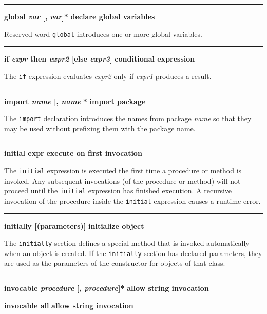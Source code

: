 \bigskip\hrule\vspace{0.1cm}
\noindent
{\bf \textbf{global} \textit{var} [, \textit{var}]* } \hfill {\bf declare global variables}

\noindent
{}Reserved word \texttt{global} introduces one or more
global variables.

\bigskip\hrule\vspace{0.1cm}
\noindent
{\bf \textbf{if} \textit{expr} then \textit{expr2} [else \textit{expr3}] } \hfill {\bf conditional expression}

\noindent
{}The \texttt{if} expression evaluates \textit{expr2} only if
\textit{expr1} produces a result.

\bigskip\hrule\vspace{0.1cm}
\noindent
{\bf \textbf{import} \textit{name} [, \textit{name}]* } \hfill {\bf import package}

\noindent
{}The \texttt{import} declaration introduces the names from
package \textit{name} so that they may be used without prefixing them
with the package name.

\bigskip\hrule\vspace{0.1cm}
\noindent
{\bf initial expr } \hfill {\bf execute on first invocation}

\noindent
{}The \texttt{initial} expression is executed the first
time a procedure or method is invoked.
Any subsequent invocations (of the procedure or method) \ConcurrencyIssue
will not proceed until the \texttt{initial} expression has finished execution.
A recursive invocation of the procedure inside the \texttt{initial} expression
causes a runtime error.

\bigskip\hrule\vspace{0.1cm}
\noindent
{\bf \textbf{initially} [(parameters)] } \hfill {\bf initialize object}

\noindent
{}The \texttt{initially} section defines a special method
that is invoked automatically when an object is created. If the
\texttt{initially} section has declared parameters, they are used as
the parameters of the constructor for objects
of that class.

\bigskip\hrule\vspace{0.1cm}
\noindent
{\bf \textbf{invocable} \textit{procedure} [, \textit{procedure}]* } \hfill {\bf allow string invocation}

\noindent
{}
{\textbf{invocable all} } \hfill {\bf allow string invocation}

